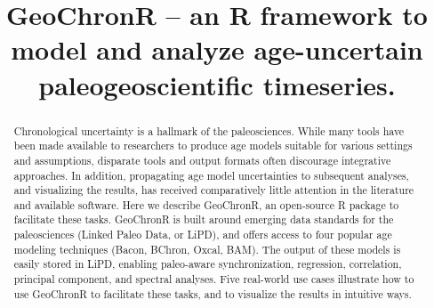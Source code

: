 \documentclass[gc, manuscript]{copernicus}
\begin{document}
\title{GeoChronR -- an R framework to model and analyze age-uncertain paleogeoscientific timeseries.}














\received{}
\pubdiscuss{} %
\revised{}
\accepted{}
\published{}




\maketitle


\begin{abstract}
Chronological uncertainty is a hallmark of the paleosciences. While many tools have been made available to researchers to produce age models suitable for various settings and assumptions, disparate tools and output formats often discourage integrative approaches. In addition, propagating age model uncertainties to subsequent analyses, and visualizing the results, has received comparatively little attention in the literature and available software. Here we describe GeoChronR, an open-source R package to facilitate these tasks. GeoChronR is built around emerging data standards for the paleosciences (Linked Paleo Data, or LiPD), and offers access to four popular age modeling techniques (Bacon, BChron, Oxcal, BAM). The output of these models is easily stored in LiPD, enabling paleo-aware synchronization, regression, correlation, principal component, and spectral analyses. Five real-world use cases illustrate how to use GeoChronR to facilitate these tasks, and to visualize the results in intuitive ways.
\end{abstract}
\end{document}

